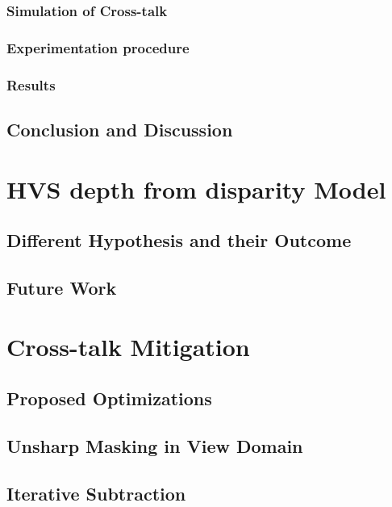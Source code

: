\subsubsection{Simulation of Cross-talk}
\subsubsection{Experimentation procedure}
\subsubsection{Results}

\subsection{Conclusion and Discussion}


\section{HVS depth from disparity Model}
\subsection{Different Hypothesis and their Outcome}
\subsection{Future Work}


\section{Cross-talk Mitigation}
\subsection{Proposed Optimizations}
\subsection{Unsharp Masking in View Domain}
\subsection{Iterative Subtraction}


